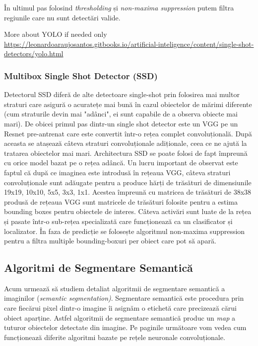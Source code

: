 În ultimul pas folosind \textit{thresholding} și \textit{non-maxima suppression} putem filtra regiunile care nu sunt detectări valide.


More about YOLO if needed only
\url{https://leonardoaraujosantos.gitbooks.io/artificial-inteligence/content/single-shot-detectors/yolo.html}

\subsubsection{Multibox Single Shot Detector (SSD)}	
Detectorul SSD diferă de alte detectoare single-shot prin folosirea mai multor straturi care asigură o acuratețe mai bună în cazul obiectelor de mărimi diferente (cum straturile devin mai "adânci", ei sunt capabile de a observa obiecte mai mari).\newline
De obicei primul pas dintr-un single shot detector este un VGG pe un Resnet pre-antrenat care este convertit într-o rețea complet convoluțională. După aceasta se atașează câteva straturi convoluționale adiționale, ceea ce ne ajută la tratarea obiectelor mai mari. Architectura SSD se poate folosi de fapt împreună cu orice model bazat pe o rețea adâncă.\newline
Un lucru important de observat este faptul că după ce imaginea este introdusă în rețeaua VGG, câteva straturi convoluționale sunt adăugate pentru a produce hărți de trăsături de dimensiunile 19x19, 10x10, 5x5, 3x3, 1x1. Acestea împreună cu matricea de trăsături de 38x38 produsă de rețeaua VGG sunt matricele de trăsături folosite pentru a estima bounding boxes pentru obiectele de interes.\newline
Câteva activări sunt luate de la rețea și pasate într-o sub-rețea specializată care funcționează ca un clasificator și localizator. În faza de predicție se folosește algoritmul non-maxima suppression pentru a filtra multiple bounding-boxuri per obiect care pot să apară.


\subsection{Algoritmi de Segmentare Semantică}
Acum urmează să studiem detaliat algoritmii de segmentare semantică a imaginilor (\textit{semantic segmentation)}. Segmentare semantică este procedura prin care fiecărui pixel dintr-o imagine îi asignăm o etichetă care precizează cărui obiect aparține. Astfel algoritmii de segmentare semantică produc un \textit{map} a tuturor obiectelor detectate din imagine. Pe paginile următoare vom vedea cum funcționează diferite algoritmi bazate pe rețele neuronale convoluționale.

